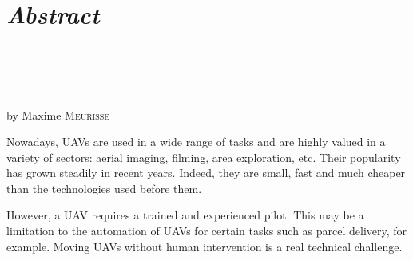 \chapter*{\centering \textit{Abstract}}

\begin{minipage}[t][0.25\textheight]{\textwidth}
    \begin{center}
        \makeatletter
        
        {\scshape\Large\@institute}\vspace{1.5em}\\
        {\large\@faculty}\vspace{0.5em}\\
        \@department\vspace{1.5em}\\
        
        {\bfseries \@title}\vspace{1em}\\
        by Maxime \textsc{Meurisse}
        
        \makeatother
    \end{center}
\end{minipage}

Nowadays, UAVs are used in a wide range of tasks and are highly valued in a variety of sectors: aerial imaging, filming, area exploration, etc. Their popularity has grown steadily in recent years. Indeed, they are small, fast and much cheaper than the technologies used before them.

However, a UAV requires a trained and experienced pilot. This may be a limitation to the automation of UAVs for certain tasks such as parcel delivery, for example. Moving UAVs without human intervention is a real technical challenge.

\thispagestyle{empty}
